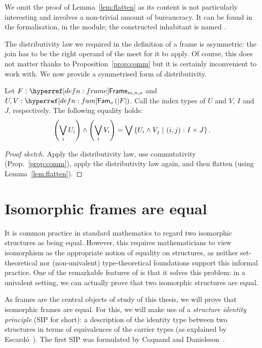 We omit the proof of Lemma~\ref{lem:flatten} as its content is not particularly
interesting and involves a non-trivial amount of bureaucracy. It can be found in the
\veragda{} formalisation, in the  module; the constructed inhabitant is
named .

The distributivity law we required in the definition of a frame is asymmetric: the join
has to be the right operand of the meet for it to apply. Of course, this does not matter
thanks to Proposition~\ref{prop:comm} but it is certainly inconvenient to work with. We
now provide a symmetrised form of distributivity.

\begin{prop}\label{prop:distr}
  Let $\oftyI{F}{\framety{m}{n}{o}}$ and $\oftyII{U}{V}{\sub{o}{\abs{F}}}$. Call the index
  types of $U$ and $V$, $I$ and $J$, respectively. The following equality holds:
  \begin{equation*}
      \left( \bigvee_i U_i \right) \wedge \left( \bigvee_i V_i \right)
    = \bigvee \left\{  U_i \wedge V_j ~|~ (i, j)\hspace{0.1mm}:\hspace{0.1mm}I \times J  \right\}.
  \end{equation*}
\end{prop}
\begin{proof}[Proof sketch]
  Apply the distributivity law, use commutativity (Prop.~\ref{prop:comm}), apply the
  distributivity law again, and then flatten (using Lemma~\ref{lem:flatten}).
\end{proof}

\section{Isomorphic frames are equal}\label{sec:frame-univ}

It is common practice in standard mathematics to regard two isomorphic structures as being
equal. However, this requires mathematicians to view isomorphism as the appropriate notion
of equality on structures, as neither set-theoretical nor (non-univalent) type-theoretical
foundations support this informal practice. One of the remarkable features of \UF{} is
that it solves this problem: in a univalent setting, we can actually prove that two
isomorphic structures are equal.

As frames are the central objects of study of this thesis, we will prove that isomorphic
frames are equal. For this, we will make use of a \emph{structure identity principle} (SIP
for short): a description of the identity type between two structures in terms of
equivalences of the carrier types (as explained by Escardó~\cite{escardo-uf-intro}). The
first SIP was formulated by Coquand and Danielsson~\cite{coq-nad}.

